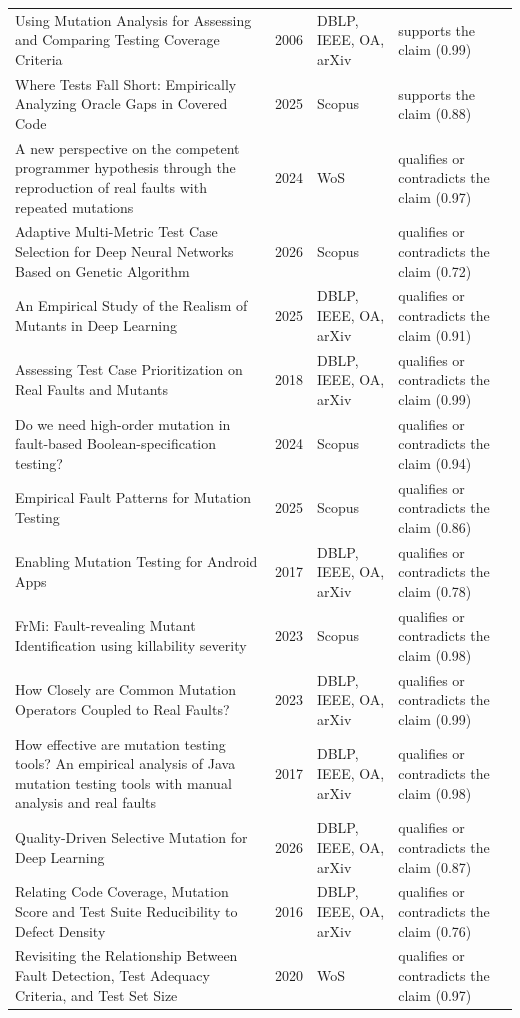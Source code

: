 \begin{longtable}{@{}%
  >{\raggedright\arraybackslash}p{}c%
  >{\raggedright\arraybackslash}p{}%
  >{\raggedright\arraybackslash}p{}@{}}
Using Mutation Analysis for Assessing and Comparing Testing Coverage Criteria & 2006 & DBLP, IEEE, OA, arXiv & supports the claim (0.99) \\
Where Tests Fall Short: Empirically Analyzing Oracle Gaps in Covered Code & 2025 & Scopus & supports the claim (0.88) \\
A new perspective on the competent programmer hypothesis through the reproduction of real faults with repeated mutations & 2024 & WoS & qualifies or contradicts the claim (0.97) \\
Adaptive Multi-Metric Test Case Selection for Deep Neural Networks Based on Genetic Algorithm & 2026 & Scopus & qualifies or contradicts the claim (0.72) \\
An Empirical Study of the Realism of Mutants in Deep Learning & 2025 & DBLP, IEEE, OA, arXiv & qualifies or contradicts the claim (0.91) \\
Assessing Test Case Prioritization on Real Faults and Mutants & 2018 & DBLP, IEEE, OA, arXiv & qualifies or contradicts the claim (0.99) \\
Do we need high-order mutation in fault-based Boolean-specification testing? & 2024 & Scopus & qualifies or contradicts the claim (0.94) \\
Empirical Fault Patterns for Mutation Testing & 2025 & Scopus & qualifies or contradicts the claim (0.86) \\
Enabling Mutation Testing for Android Apps & 2017 & DBLP, IEEE, OA, arXiv & qualifies or contradicts the claim (0.78) \\
FrMi: Fault-revealing Mutant Identification using killability severity & 2023 & Scopus & qualifies or contradicts the claim (0.98) \\
How Closely are Common Mutation Operators Coupled to Real Faults? & 2023 & DBLP, IEEE, OA, arXiv & qualifies or contradicts the claim (0.99) \\
How effective are mutation testing tools? An empirical analysis of Java mutation testing tools with manual analysis and real faults & 2017 & DBLP, IEEE, OA, arXiv & qualifies or contradicts the claim (0.98) \\
Quality-Driven Selective Mutation for Deep Learning & 2026 & DBLP, IEEE, OA, arXiv & qualifies or contradicts the claim (0.87) \\
Relating Code Coverage, Mutation Score and Test Suite Reducibility to Defect Density & 2016 & DBLP, IEEE, OA, arXiv & qualifies or contradicts the claim (0.76) \\
Revisiting the Relationship Between Fault Detection, Test Adequacy Criteria, and Test Set Size & 2020 & WoS & qualifies or contradicts the claim (0.97) \\

\end{longtable}
